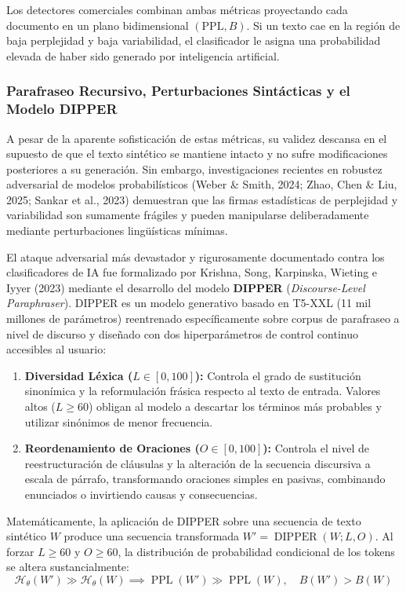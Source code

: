 Los detectores comerciales combinan ambas métricas proyectando cada documento en un plano bidimensional $(\text{PPL}, B)$. Si un texto cae en la región de baja perplejidad y baja variabilidad, el clasificador le asigna una probabilidad elevada de haber sido generado por inteligencia artificial.

\subsubsection{Parafraseo Recursivo, Perturbaciones Sintácticas y el Modelo DIPPER}

A pesar de la aparente sofisticación de estas métricas, su validez descansa en el supuesto de que el texto sintético se mantiene intacto y no sufre modificaciones posteriores a su generación. Sin embargo, investigaciones recientes en robustez adversarial de modelos probabilísticos (Weber \& Smith, 2024; Zhao, Chen \& Liu, 2025; Sankar et al., 2023) demuestran que las firmas estadísticas de perplejidad y variabilidad son sumamente frágiles y pueden manipularse deliberadamente mediante perturbaciones lingüísticas mínimas.

El ataque adversarial más devastador y rigurosamente documentado contra los clasificadores de IA fue formalizado por Krishna, Song, Karpinska, Wieting e Iyyer (2023) mediante el desarrollo del modelo \textbf{DIPPER} (\textit{Discourse-Level Paraphraser}). DIPPER es un modelo generativo basado en T5-XXL (11 mil millones de parámetros) reentrenado específicamente sobre corpus de parafraseo a nivel de discurso y diseñado con dos hiperparámetros de control continuo accesibles al usuario:
\begin{enumerate}
    \item \textbf{Diversidad Léxica ($L \in [0, 100]$):} Controla el grado de sustitución sinonímica y la reformulación frásica respecto al texto de entrada. Valores altos ($L \ge 60$) obligan al modelo a descartar los términos más probables y utilizar sinónimos de menor frecuencia.
    \item \textbf{Reordenamiento de Oraciones ($O \in [0, 100]$):} Controla el nivel de reestructuración de cláusulas y la alteración de la secuencia discursiva a escala de párrafo, transformando oraciones simples en pasivas, combinando enunciados o invirtiendo causas y consecuencias.
\end{enumerate}

Matemáticamente, la aplicación de DIPPER sobre una secuencia de texto sintético $W$ produce una secuencia transformada $W\prime = \operatorname{DIPPER}(W; L, O)$. Al forzar $L \ge 60$ y $O \ge 60$, la distribución de probabilidad condicional de los tokens se altera sustancialmente:
\begin{equation}
\mathcal{H}_\theta(W\prime) \gg \mathcal{H}_\theta(W) \implies \operatorname{PPL}(W\prime) \gg \operatorname{PPL}(W), \quad B(W\prime) > B(W)
\end{equation}

